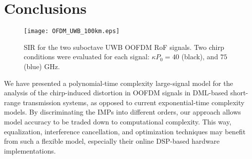 \documentclass[journal]{IEEEtran}
\begin{document}
\section{Conclusions} \label{sec:conclusion}
\begin{figure}[t]
\centering
\texttt{[image: OFDM\_UWB\_100km.eps]}
\caption{SIR for the two suboctave UWB OOFDM RoF signals. Two chirp conditions were evaluated for each signal: $\kappa P_0 = 40$ (black), and $75$ (blue) GHz.} \label{fig:SIR2}
\end{figure}
We have presented a polynomial-time complexity large-signal model for the analysis of the chirp-induced distortion in OOFDM signals in DML-based short-range transmission systems, as opposed to current exponential-time complexity models. By discriminating the IMPs into different orders, our approach allows model accuracy to be traded down to computational complexity. This way, equalization, interference cancellation, and optimization techniques may benefit from such a flexible model, especially their online DSP-based hardware implementations. 


\end{document}
